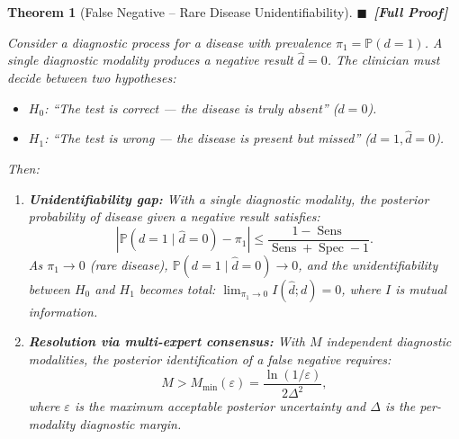 \documentclass[11pt,a4paper]{article}
\newtheorem{theorem}{Theorem}[section]
\theoremstyle{definition}
\newcommand{\rigorFull}[0]{$\blacksquare$~\textbf{[Full Proof]}}
\DeclareMathOperator{\Sens}{Sens}
\DeclareMathOperator{\Spec}{Spec}
\newcommand{\Pbb}{\mathbb{P}}
\newcommand{\abs}[1]{\left|#1\right|}
\newcommand{\disease}{d}                       %
\newcommand{\diagnosis}{\hat{d}}               %
\begin{document}
\begin{theorem}[False Negative -- Rare Disease Unidentifiability]
\label{thm:FN_rare_unidentifiability}
\rigorFull

Consider a diagnostic process for a disease with prevalence $\pi_1 = \Pbb(\disease = 1)$.
A single diagnostic modality produces a negative result $\diagnosis = 0$.
The clinician must decide between two hypotheses:

\begin{itemize}[nosep]
    \item $H_0$: ``The test is correct --- the disease is truly absent'' ($\disease = 0$).
    \item $H_1$: ``The test is wrong --- the disease is present but missed'' ($\disease = 1, \diagnosis = 0$).
\end{itemize}

Then:

\begin{enumerate}[label=(\roman*)]
    \item \textbf{Unidentifiability gap:} With a single diagnostic modality, the
    posterior probability of disease given a negative result satisfies:
    \begin{equation}\label{eq:posterior_bound}
        \abs{\Pbb(\disease = 1 \mid \diagnosis = 0) - \pi_1} \le \frac{1 - \Sens}{\Sens + \Spec - 1}.
    \end{equation}
    As $\pi_1 \to 0$ (rare disease), $\Pbb(\disease = 1 \mid \diagnosis = 0) \to 0$,
    and the unidentifiability between $H_0$ and $H_1$ becomes total:
    $\lim_{\pi_1 \to 0} I(\diagnosis; \disease) = 0$, where $I$ is mutual information.

    \item \textbf{Resolution via multi-expert consensus:} With $M$ independent
    diagnostic modalities, the posterior identification of a false negative
    requires:
    \begin{equation}\label{eq:M_required_rare}
        M > M_{\min}(\varepsilon) = \frac{\ln(1/\varepsilon)}{2\Delta^2},
    \end{equation}
    where $\varepsilon$ is the maximum acceptable posterior uncertainty
    and $\Delta$ is the per-modality diagnostic margin.
\end{enumerate}
\end{theorem}
\end{document}

